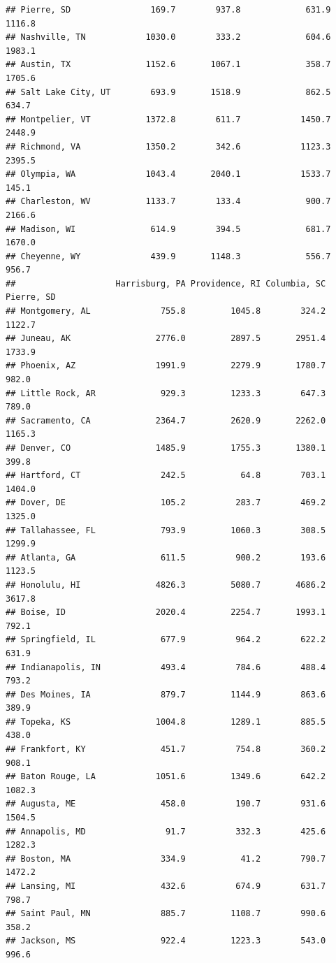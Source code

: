 \documentclass[
]{article}
\begin{document}
\begin{verbatim}
## Pierre, SD                169.7        937.8             631.9    1116.8
## Nashville, TN            1030.0        333.2             604.6    1983.1
## Austin, TX               1152.6       1067.1             358.7    1705.6
## Salt Lake City, UT        693.9       1518.9             862.5     634.7
## Montpelier, VT           1372.8        611.7            1450.7    2448.9
## Richmond, VA             1350.2        342.6            1123.3    2395.5
## Olympia, WA              1043.4       2040.1            1533.7     145.1
## Charleston, WV           1133.7        133.4             900.7    2166.6
## Madison, WI               614.9        394.5             681.7    1670.0
## Cheyenne, WY              439.9       1148.3             556.7     956.7
##                    Harrisburg, PA Providence, RI Columbia, SC Pierre, SD
## Montgomery, AL              755.8         1045.8        324.2     1122.7
## Juneau, AK                 2776.0         2897.5       2951.4     1733.9
## Phoenix, AZ                1991.9         2279.9       1780.7      982.0
## Little Rock, AR             929.3         1233.3        647.3      789.0
## Sacramento, CA             2364.7         2620.9       2262.0     1165.3
## Denver, CO                 1485.9         1755.3       1380.1      399.8
## Hartford, CT                242.5           64.8        703.1     1404.0
## Dover, DE                   105.2          283.7        469.2     1325.0
## Tallahassee, FL             793.9         1060.3        308.5     1299.9
## Atlanta, GA                 611.5          900.2        193.6     1123.5
## Honolulu, HI               4826.3         5080.7       4686.2     3617.8
## Boise, ID                  2020.4         2254.7       1993.1      792.1
## Springfield, IL             677.9          964.2        622.2      631.9
## Indianapolis, IN            493.4          784.6        488.4      793.2
## Des Moines, IA              879.7         1144.9        863.6      389.9
## Topeka, KS                 1004.8         1289.1        885.5      438.0
## Frankfort, KY               451.7          754.8        360.2      908.1
## Baton Rouge, LA            1051.6         1349.6        642.2     1082.3
## Augusta, ME                 458.0          190.7        931.6     1504.5
## Annapolis, MD                91.7          332.3        425.6     1282.3
## Boston, MA                  334.9           41.2        790.7     1472.2
## Lansing, MI                 432.6          674.9        631.7      798.7
## Saint Paul, MN              885.7         1108.7        990.6      358.2
## Jackson, MS                 922.4         1223.3        543.0      996.6

\end{verbatim}
\end{document}
